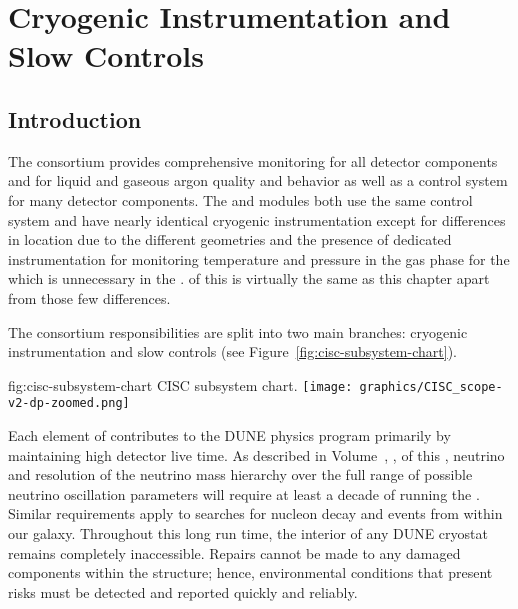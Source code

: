 \chapter{Cryogenic Instrumentation and Slow Controls}
\label{ch:dp-cisc}


\section{Introduction} 

The  consortium provides comprehensive monitoring for all detector components and for liquid and gaseous argon quality and behavior as well as a control system for many detector components.
The  and  modules both use the same control
system and have nearly identical cryogenic instrumentation except
for differences in location due to the different 
geometries and the presence of dedicated instrumentation for
monitoring temperature and pressure in the gas phase for the
 which is unnecessary in the .  
\spchcisc{} of this  is
virtually the same as this chapter apart from those few
differences.

The consortium responsibilities are split into 
two main branches: cryogenic instrumentation and slow controls (see Figure~\ref{fig:cisc-subsystem-chart}). 

\begin{dunefigure}{fig:cisc-subsystem-chart}
  {CISC subsystem chart.}
  \texttt{[image: graphics/CISC\_scope-v2-dp-zoomed.png]}
\end{dunefigure}

Each element of  contributes to the DUNE physics program primarily by maintaining high detector live time.  As described in Volume~\volnumberphysics{}, \voltitlephysics{}, of this , neutrino  and resolution of the neutrino mass hierarchy over the full range of possible neutrino oscillation parameters will require at least a decade of running the .  Similar requirements apply to searches for nucleon decay and  events from within our galaxy.  Throughout this long run time, the interior of any DUNE cryostat remains completely inaccessible.  Repairs cannot be made to any damaged components within the  structure; hence, environmental conditions that present risks must be detected and reported quickly and reliably. 
 
